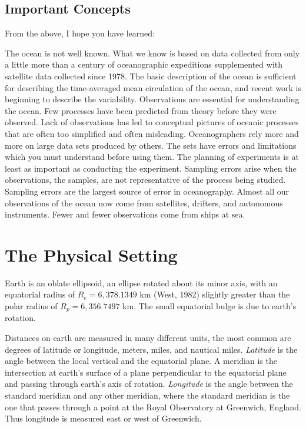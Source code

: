 \section{Important Concepts}
From the above, I hope you have learned:
\begin{enumerate}
\vitem
The ocean is not well known. What we know is based on data collected from
only a little more than a century of oceanographic expeditions supplemented with
satellite data collected since 1978.
\vitem
The basic description of the ocean is sufficient for describing the
time-averaged mean circulation of the ocean, and recent work is beginning to
describe the variability.
\vitem
Observations are essential for understanding the ocean. Few processes
have been predicted from theory before they were observed.
\vitem
Lack of observations has led to conceptual pictures of oceanic processes that are often too
simplified and often misleading.
\vitem
Oceanographers rely more and more on large data sets produced by others.
The sets have errors and limitations which you must understand before using
them.
\vitem
The planning of experiments is at least as important as conducting the
experiment.
\vitem
Sampling errors arise when the observations, the samples, are not
representative of the process being studied. Sampling errors are the
largest source of error in oceanography.
\vitem
Almost all our observations of the ocean now come from satellites, drifters, and autonomous instruments. Fewer and fewer observations come from ships at sea.
\end{enumerate}

\chapter{The Physical Setting}
\addtocounter{figure}{1}

Earth is an oblate ellipsoid, an ellipse rotated about its minor axis, with an
equatorial radius of $R_e = 6,378.1349$ km (West, 1982) slightly greater than the polar radius of
$R_p = 6,356.7497$ km. The small equatorial bulge is due to earth's rotation.

Distances on earth are measured in many different units, the most common are degrees of
latitude or longitude, meters, miles, and nautical miles.
\textit{Latitude} is the angle between the local vertical and the
equatorial plane. A meridian is the intersection at earth's surface of a plane  perpendicular
to the equatorial plane and passing through earth's axis of rotation.
\textit{Longitude} is the angle between the standard meridian and any
other meridian, where the standard meridian is the one that passes through a point at the
Royal Observatory at Greenwich, England.  Thus longitude is measured east or west of Greenwich.

